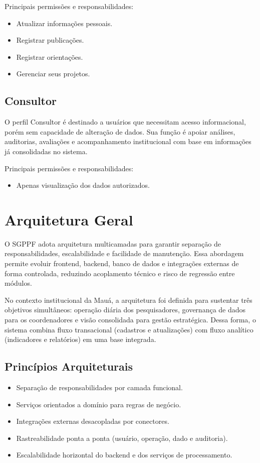 \documentclass[12pt,a4paper]{article}
\begin{document}
Principais permissões e responsabilidades:
\begin{itemize}[leftmargin=*]
  \item Atualizar informações pessoais.
  \item Registrar publicações.
  \item Registrar orientações.
  \item Gerenciar seus projetos.
\end{itemize}

\subsection{Consultor}
O perfil Consultor é destinado a usuários que necessitam acesso informacional, porém sem capacidade de alteração de dados. Sua função é apoiar análises, auditorias, avaliações e acompanhamento institucional com base em informações já consolidadas no sistema.

Principais permissões e responsabilidades:
\begin{itemize}[leftmargin=*]
  \item Apenas visualização dos dados autorizados.
\end{itemize}

\section{Arquitetura Geral}
O SGPPF adota arquitetura multicamadas para garantir separação de responsabilidades, escalabilidade e facilidade de manutenção. Essa abordagem permite evoluir frontend, backend, banco de dados e integrações externas de forma controlada, reduzindo acoplamento técnico e risco de regressão entre módulos.

No contexto institucional da Mauá, a arquitetura foi definida para sustentar três objetivos simultâneos: operação diária dos pesquisadores, governança de dados para os coordenadores e visão consolidada para gestão estratégica. Dessa forma, o sistema combina fluxo transacional (cadastros e atualizações) com fluxo analítico (indicadores e relatórios) em uma base integrada.

\subsection{Princípios Arquiteturais}
\begin{itemize}[leftmargin=*]
  \item Separação de responsabilidades por camada funcional.
  \item Serviços orientados a domínio para regras de negócio.
  \item Integrações externas desacopladas por conectores.
  \item Rastreabilidade ponta a ponta (usuário, operação, dado e auditoria).
  \item Escalabilidade horizontal do backend e dos serviços de processamento.
\end{itemize}
\end{document}
